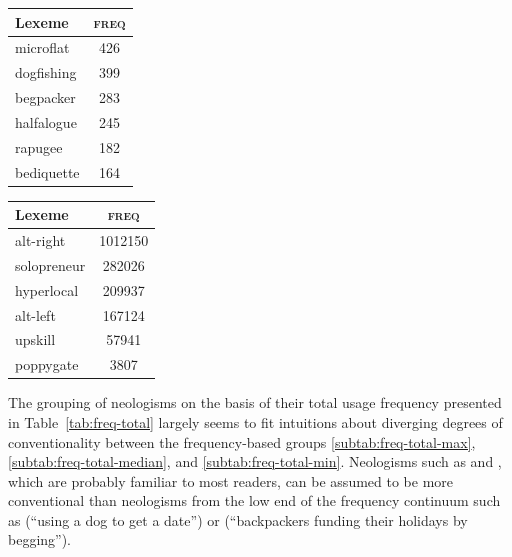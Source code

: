 \documentclass[
  a4paper,
  abstract=on,
  captions=tableabove
  ]{scrartcl}
\begin{document}
\begin{table}
      \vspace{\baselineskip}

        \begin{subtable}{.4\linewidth}
          \label{subtab:freq-total-min}
          \centering
          \begin{tabular}{l S[table-format=3]}
            \toprule
            Lexeme     & {\textsc{freq}} \\
            \midrule
            microflat  & 426             \\
            dogfishing & 399             \\
            begpacker  & 283             \\
            halfalogue & 245             \\
            rapugee    & 182             \\
            bediquette & 164             \\
            \bottomrule
          \end{tabular}
        \end{subtable}
        \begin{subtable}{.4\linewidth}
          \label{subtab:freq-total-cases}
          \centering
          \begin{tabular}{l S[table-format=7]}
            \toprule
            Lexeme       & {\textsc{freq}}  \\
            \midrule
            alt-right    & 1012150 \\
            solopreneur  & 282026  \\
            hyperlocal   & 209937  \\
            alt-left     & 167124  \\
            upskill      & 57941   \\
            poppygate    & 3807    \\
            \bottomrule
          \end{tabular}
        \end{subtable}
      \end{table}

      The grouping of neologisms on the basis of their total usage frequency presented in Table~\ref{tab:freq-total} largely seems to fit intuitions about diverging degrees of conventionality between the frequency-based groups \ref{subtab:freq-total-max}, \ref{subtab:freq-total-median}, and \ref{subtab:freq-total-min}. Neologisms such as  and , which are probably familiar to most readers, can be assumed to be more conventional than neologisms from the low end of the frequency continuum such as  (\enquote{using a dog to get a date}) or  (\enquote{backpackers funding their holidays by begging}).
\end{document}
